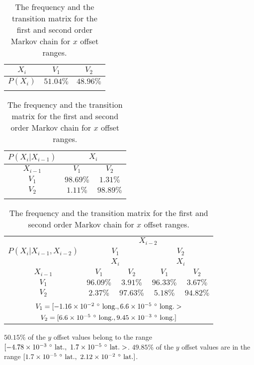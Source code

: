 \documentclass[preprint,12pt]{elsarticle}
\begin{document}
\begin{table}[!ht]
\centering
\begin{tabular}{|c|c|c|}
\hline
$X_{i}$ & $V_{1}$ & $V_{2}$\\ \hline
$P(X_{i})$ & $51.04\%$ & $48.96\%$\\ \hline
\multicolumn{3}{c}{}\\
\end{tabular}

\begin{tabular}{|c|c|c|}
\hline
$P(X_{i}|X_{i-1})$ & \multicolumn{2}{|c|}{$X_{i}$}\\ \hline
$X_{i-1}$ & $V_{1}$ & $V_{2}$\\ \hline
$V_{1}$ & $98.69\%$ & $1.31\%$\\ \hline
$V_{2}$ & $1.11\%$ & $98.89\%$\\ \hline
\multicolumn{3}{c}{}\\
\end{tabular}

\begin{tabular}{|c|c|c|c|c|}
\hline
\multirow{3}{*}{$P(X_{i}|X_{i-1},X_{i-2})$} & \multicolumn{4}{|c|}{$X_{i-2}$}\\ \cline{2-5}
 & \multicolumn{2}{|c|}{$V_{1}$} & \multicolumn{2}{|c|}{$V_{2}$}\\ \cline{2-5}
 & \multicolumn{2}{|c|}{$X_{i}$} & \multicolumn{2}{|c|}{$X_{i}$}\\ \hline
$X_{i-1}$ & $V_{1}$ & $V_{2}$ & $V_{1}$ & $V_{2}$\\ \hline
$V_{1}$ & $96.09\%$ & $3.91\%$ & $96.33\%$ & $3.67\%$\\ \hline
$V_{2}$ & $2.37\%$ & $97.63\%$ & $5.18\%$ & $94.82\%$\\ \hline
\multicolumn{5}{c}{}\\
\multicolumn{5}{c}{$V_{1} = [-1.16 \times 10^{-2} \ \degree \  \mathrm{long.}, 6.6 \times 10^{-5} \ \degree \  \mathrm{long.}>$}\\
\multicolumn{5}{c}{$V_{2} = [6.6 \times 10^{-5} \ \degree \  \mathrm{long.}, 9.45 \times 10^{-3} \ \degree \  \mathrm{long.}]$}\\
\end{tabular}
\caption{The frequency and the transition matrix for the first and second order Markov chain for $x$ offset ranges.}
\label{tab:longitude_no_abs}
\end{table}

$50.15\%$ of the $y$ offset values belong to the range $[-4.78 \times 10^{-3} \ \degree \ \mathrm{lat.}, \ 1.7 \times 10^{-5} \ \degree \ \mathrm{lat.}>$. $49.85\%$ of the $y$ offset values are in the range $[1.7 \times 10^{-5} \ \degree \ \mathrm{lat.}, \ 2.12 \times 10^{-2} \ \degree \ \mathrm{lat.}]$.
\end{document}
